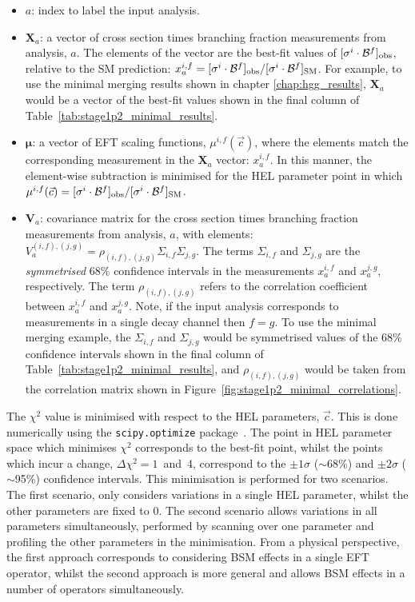 \begin{itemize}
    \item $a$: index to label the input analysis.
    \item $\mathbf{X}_a$: a vector of cross section times branching fraction measurements from analysis, $a$. The elements of the vector are the best-fit values of $[\sigma^i\cdot\mathcal{B}^f]_{\rm{obs}}$, relative to the SM prediction: $x^{i,f}_a=[\sigma^i\cdot\mathcal{B}^f]_{\rm{obs}}/[\sigma^i\cdot\mathcal{B}^f]_{\rm{SM}}$. For example, to use the \Hgg minimal merging results shown in chapter \ref{chap:hgg_results}, $\mathbf{X}_a$ would be a vector of the best-fit values shown in the final column of Table~\ref{tab:stage1p2_minimal_results}.
    \item $\pmb{\mu}$: a vector of EFT scaling functions, $\mu^{i,f}(\vec{c})$, where the elements match the corresponding measurement in the $\mathbf{X}_a$ vector: $x^{i,f}_a$. In this manner, the element-wise subtraction is minimised for the HEL parameter point in which $\mu^{i,f}(\vec{c})=[\sigma^i\cdot\mathcal{B}^f]_{\rm{obs}}/[\sigma^i\cdot\mathcal{B}^f]_{\rm{SM}}$.
    \item $\mathbf{V}_a$: covariance matrix for the cross section times branching fraction measurements from analysis, $a$, with elements: $V^{(i,f),(j,g)}_a = \rho_{(i,f),(j,g)}\Sigma_{i,f}\Sigma_{j,g}$. The terms $\Sigma_{i,f}$ and $\Sigma_{j,g}$ are the \textit{symmetrised} 68\% confidence intervals in the measurements $x^{i,f}_a$ and $x^{j,g}_a$, respectively. The term $\rho_{(i,f),(j,g)}$ refers to the correlation coefficient between $x^{i,f}_a$ and $x^{j,g}_a$. Note, if the input analysis corresponds to measurements in a single decay channel then $f=g$. To use the \Hgg minimal merging example, the $\Sigma_{i,f}$ and $\Sigma_{j,g}$ would be symmetrised values of the 68\% confidence intervals shown in the final column of Table~\ref{tab:stage1p2_minimal_results}, and $\rho_{(i,f),(j,g)}$ would be taken from the correlation matrix shown in Figure~\ref{fig:stage1p2_minimal_correlations}.
\end{itemize}

The $\chi^2$ value is minimised with respect to the HEL parameters, $\vec{c}$. This is done numerically using the \texttt{scipy.optimize} package~\cite{scipy}. The point in HEL parameter space which minimises $\chi^2$ corresponds to the best-fit point, whilst the points which incur a change, $\Delta\chi^2=1$~and~4, correspond to the $\pm1\sigma$ ($\sim$68\%) and $\pm2\sigma$ ($\sim$95\%) confidence intervals. This minimisation is performed for two scenarios. The first scenario, only considers variations in a single HEL parameter, whilst the other parameters are fixed to 0. The second scenario allows variations in all parameters simultaneously, performed by scanning over one parameter and profiling the other parameters in the minimisation. From a physical perspective, the first approach corresponds to considering BSM effects in a single EFT operator, whilst the second approach is more general and allows BSM effects in a number of operators simultaneously.

